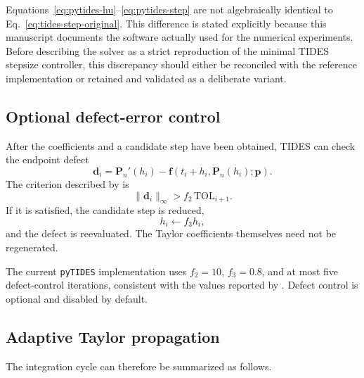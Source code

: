 \documentclass[11pt]{article}
\begin{document}
Equations~\eqref{eq:pytides-hu}--\eqref{eq:pytides-step} are not
algebraically identical to Eq.~\eqref{eq:tides-step-original}. This
difference is stated explicitly because this manuscript documents the
software actually used for the numerical experiments. Before describing the
solver as a strict reproduction of the minimal TIDES stepsize controller,
this discrepancy should either be reconciled with the reference
implementation or retained and validated as a deliberate variant.

\subsection{Optional defect-error control}

After the coefficients and a candidate step have been obtained, TIDES can
check the endpoint defect
\begin{equation}
    \bm d_i
    =
    \bm P_n'(h_i)
    -
    \bm f(t_i+h_i,\bm P_n(h_i);\bm p).
    \label{eq:defect}
\end{equation}
The criterion described by \citet{Abad2012} is
\begin{equation}
    \|\bm d_i\|_\infty
    >
    f_2\,\mathrm{TOL}_{i+1}.
    \label{eq:defect-criterion}
\end{equation}
If it is satisfied, the candidate step is reduced,
\begin{equation}
    h_i\leftarrow f_3h_i,
\end{equation}
and the defect is reevaluated. The Taylor coefficients themselves need not be
regenerated.

The current \texttt{pyTIDES} implementation uses $f_2=10$, $f_3=0.8$, and
at most five defect-control iterations, consistent with the values reported
by \citet{Abad2012}. Defect control is optional and disabled by default.

\subsection{Adaptive Taylor propagation}

The integration cycle can therefore be summarized as follows.
\end{document}
